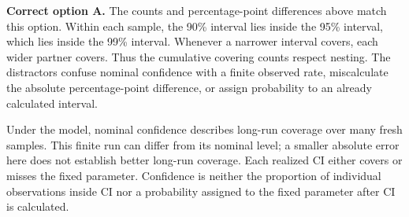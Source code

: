 \textbf{Correct option A.} The counts and percentage-point differences above match this option. Within each sample, the 90\% interval lies inside the 95\% interval, which lies inside the 99\% interval. Whenever a narrower interval covers, each wider partner covers. Thus the cumulative covering counts respect nesting. The distractors confuse nominal confidence with a finite observed rate, miscalculate the absolute percentage-point difference, or assign probability to an already calculated interval.

Under the model, nominal confidence describes long-run coverage over many fresh samples. This finite run can differ from its nominal level; a smaller absolute error here does not establish better long-run coverage. Each realized $\mathrm{CI}$ either covers or misses the fixed parameter. Confidence is neither the proportion of individual observations inside $\mathrm{CI}$ nor a probability assigned to the fixed parameter after $\mathrm{CI}$ is calculated.
\par\nopagebreak[4]
\par\vspace{3mm}

